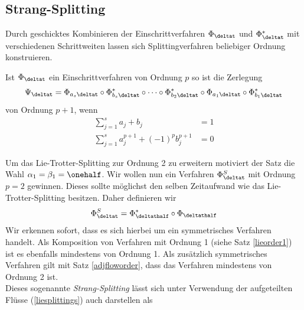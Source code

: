 \subsection{Strang-Splitting}
\label{secstrang}
Durch geschicktes Kombinieren der Einschrittverfahren $\Phi_{\deltat}$ und $\Phi_{\deltat}^*$ mit verschiedenen Schrittweiten lassen sich Splittingverfahren beliebiger Ordnung konstruieren.
\begin{maththeorem}
Ist $\Phi_{\deltat}$ ein Einschrittverfahren von Ordnung $p$ so ist die Zerlegung
\[\Psi_{\deltat}=\Phi_{a_s\deltat}\circ \Phi_{b_s\deltat}^*\circ\dots\circ\Phi_{b_2\deltat}^*\circ\Phi_{a_1\deltat}\circ\Phi_{b_1\deltat}^*\]
von Ordnung $p+1$, wenn 
\begin{align*}
\sum_{j=1}^sa_j+b_j&=1\\
\sum_{j=1}^sa_j^{p+1}+(-1)^pb_j^{p+1}&=0
\end{align*}
\end{maththeorem}
Um das Lie-Trotter-Splitting zur Ordnung 2 zu erweitern motiviert der Satz die Wahl $\alpha_1=\beta_1=\onehalf$. Wir wollen nun ein Verfahren $\Phi_{\deltat}^S$ mit Ordnung $p=2$ gewinnen. Dieses sollte möglichst den selben Zeitaufwand wie das Lie-Trotter-Splitting besitzen. Daher definieren wir
\[\Phi_{\deltat}^S=\Phi_{\deltathalf}^*\circ\Phi_{\deltathalf}\]
Wir erkennen sofort, dass es sich hierbei um ein symmetrisches Verfahren handelt. Als Komposition von Verfahren mit Ordnung 1 (siehe Satz \ref{lieorder1}) ist es ebenfalls mindestens von Ordnung 1. Als zusätzlich symmetrisches Verfahren gilt mit Satz \ref{adjfloworder}, dass das Verfahren mindestens von Ordnung 2 ist.\\
Dieses sogenannte \emph{Strang-Splitting} lässt sich unter Verwendung der aufgeteilten Flüsse (\ref{liesplittings}) auch darstellen als 


